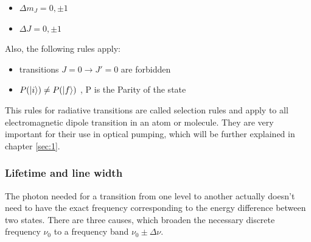\begin{itemize}
\item $\Delta m_J = 0,\pm1$
\item $\Delta J = 0, \pm 1$
\end{itemize}

Also, the following rules apply:

\begin{itemize}
\item transitions $J=0 \to J'=0$ are forbidden
\item $P(\ket{i}) \neq P(\ket{f})$ , P is the Parity of the state
\end{itemize}

This rules for radiative transitions are called selection rules and apply to all electromagnetic dipole transition in an atom or molecule. They are very important for their use in optical pumping, which will be further explained in chapter \ref{sec:1}. 

\subsubsection{Lifetime and line width}

The photon needed for a transition from one level to another actually doesn't need to have the exact frequency corresponding to the energy difference between two states. There are three causes, which broaden the necessary discrete frequency $\nu_0$ to a frequency band $\nu_0 \pm \Delta \nu$.

